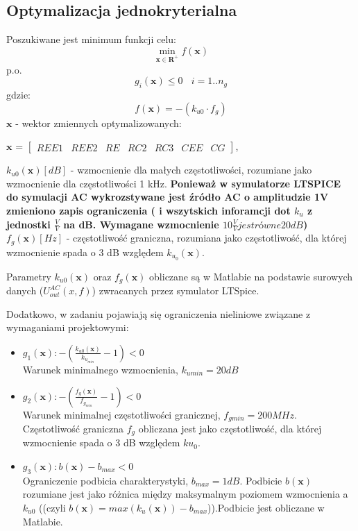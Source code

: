 \documentclass{article}
\begin{document}
\subsection{Optymalizacja jednokryterialna}
Poszukiwane jest minimum funkcji celu:
\[ \min\limits_{\textbf{x}\in \mathbf{R}^+  } f(\textbf{x}) \]
p.o.
\[ g_{i}(\textbf{x}) \leq 0 \ \ \ \  i=1..n_g\]
gdzie:
\[ f(\textbf{x}) = -(k_{u0}\cdot f_g)\]
\(\textbf{x}\) - wektor zmiennych optymalizowanych: \\
\begin{center}
    $\textbf{x}$ =
    $\begin{bmatrix}
            REE1 & REE2 & RE & RC2 & RC3 & CEE & CG
        \end{bmatrix}$,
\end{center}
\(k_{u0}(\textbf{x}) [dB]\) - wzmocnienie dla małych częstotliwości, rozumiane jako wzmocnienie dla częstotliwości 1 kHz. \textbf{Ponieważ w symulatorze LTSPICE do symulacji AC wykrozstywane jest źródło AC o amplitudzie 1V zmieniono zapis ograniczenia ( i wszytskich inforamcji
dot $k_u$ z jednostki $\frac{V}{V}$ na dB. Wymagane wzmocnienie $10\frac{V}{V} jest równe 20 dB$)}\\
\(f_{g}(\textbf{x}) [Hz]\) - częstotliwość graniczna, rozumiana jako częstotliwość, dla której wzmocnienie
spada o 3 dB względem $k_{u_{0}}(\textbf{x}) $.

Parametry $k_{u0}(\textbf{x})$ oraz $f_g(\textbf{x})$ obliczane są w Matlabie na podstawie surowych danych ($U^{AC}_{out}(x,f)$) zwracanych
przez symulator LTSpice.

Dodatkowo, w zadaniu pojawiają się ograniczenia nieliniowe związane z wymaganiami projektowymi:\\
\begin{itemize}
    \item \(g_1(\textbf{x}): -(\frac{k_{u0}(\textbf{x})}{k_{u_{min}}}-1) <  0\) \\ Warunek minimalnego wzmocnienia, $k_{umin}=20dB$
    \item \(g_2(\textbf{x}): -(\frac{{f_g}(\textbf{x})}{f_{g_{min}}}-1)<0\) \\ Warunek minimalnej częstotliwości granicznej, $f_{gmin}=200 MHz$. Częstotliwość graniczna $f_g$ obliczana jest jako częstotliwość,
          dla której wzmocnienie spada o 3 dB względem $ku_0$.
    \item \(g_3(\textbf{x}): b(\textbf{x})-b_{max}<0\) \\ Ograniczenie podbicia charakterystyki, $b_{max}=1dB$. Podbicie $b(\textbf{x})$ rozumiane jest jako różnica między maksymalnym poziomem wzmocnienia a $k_{u0}$ ((czyli $b(\textbf{x})=max(k_{u}(\textbf{x}))-b_{max}$)).Podbicie jest obliczane w Matlabie.

\end{itemize}
\end{document}
